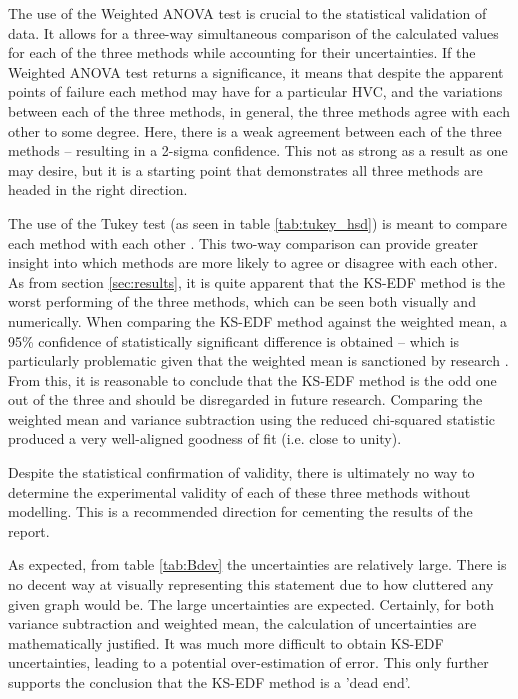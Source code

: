 The use of the Weighted ANOVA test is crucial to the statistical validation of data. It allows for a three-way simultaneous comparison of the calculated values for each of the three methods while accounting for their uncertainties. If the Weighted ANOVA test returns a significance, it means that despite the apparent points of failure each method may have for a particular HVC, and the variations between each of the three methods, in general, the three methods agree with each other to some degree. Here, there is a weak agreement between each of the three methods – resulting in a 2-sigma confidence. This not as strong as a result as one may desire, but it is a starting point that demonstrates all three methods are headed in the right direction.


The use of the Tukey test (as seen in table \ref{tab:tukey_hsd}) is meant to compare each method with each other \citep{ID77, ID78}. This two-way comparison can provide greater insight into which methods are more likely to agree or disagree with each other. As from section \ref{sec:results}, it is quite apparent that the KS-EDF method is the worst performing of the three methods, which can be seen both visually and numerically. When comparing the KS-EDF method against the weighted mean, a 95\% confidence of statistically significant difference is obtained – which is particularly problematic given that the weighted mean is sanctioned by research \citep{ID5, ID26}. From this, it is reasonable to conclude that the KS-EDF method is the odd one out of the three and should be disregarded in future research. Comparing the weighted mean and variance subtraction using the reduced chi-squared statistic produced a very well-aligned goodness of fit (i.e. close to unity).


Despite the statistical confirmation of validity, there is ultimately no way to determine the experimental validity of each of these three methods without modelling. This is a recommended direction for cementing the results of the report.


As expected, from table \ref{tab:Bdev} the uncertainties are relatively large. There is no decent way at visually representing this statement due to how cluttered any given graph would be. The large uncertainties are expected. Certainly, for both variance subtraction and weighted mean, the calculation of uncertainties are mathematically justified. It was much more difficult to obtain KS-EDF uncertainties, leading to a potential over-estimation of error. This only further supports the conclusion that the KS-EDF method is a 'dead end'.


